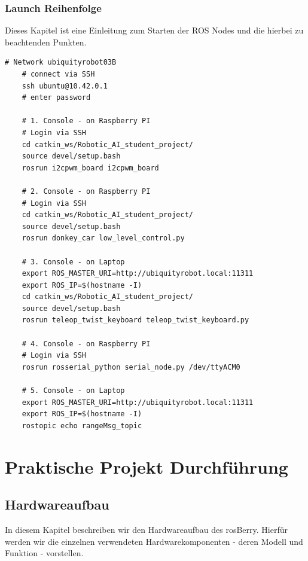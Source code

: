\documentclass[conference]{IEEEtran}
\begin{document}
	\pagebreak
	\subsubsection{Launch Reihenfolge}%
	
	Dieses Kapitel ist eine Einleitung zum Starten der ROS Nodes und die hierbei zu beachtenden Punkten.
	
	\begin{lstlisting}[label={list:first},caption=Sample rosBash code.]
	# Network ubiquityrobot03B
	# connect via SSH
	ssh ubuntu@10.42.0.1
	# enter password
	
	# 1. Console - on Raspberry PI
	# Login via SSH
	cd catkin_ws/Robotic_AI_student_project/
	source devel/setup.bash
	rosrun i2cpwm_board i2cpwm_board
	
	# 2. Console - on Raspberry PI
	# Login via SSH
	cd catkin_ws/Robotic_AI_student_project/
	source devel/setup.bash
	rosrun donkey_car low_level_control.py
	
	# 3. Console - on Laptop 
	export ROS_MASTER_URI=http://ubiquityrobot.local:11311
	export ROS_IP=$(hostname -I)
	cd catkin_ws/Robotic_AI_student_project/
	source devel/setup.bash
	rosrun teleop_twist_keyboard teleop_twist_keyboard.py
	
	# 4. Console - on Raspberry PI
	# Login via SSH
	rosrun rosserial_python serial_node.py /dev/ttyACM0
	
	# 5. Console - on Laptop
	export ROS_MASTER_URI=http://ubiquityrobot.local:11311
	export ROS_IP=$(hostname -I)
	rostopic echo rangeMsg_topic
	\end{lstlisting}
	
	\section{Praktische Projekt Durchführung}
	
	
	\subsection{Hardwareaufbau}%
	In diesem Kapitel beschreiben wir den Hardwareaufbau des rosBerry. Hierfür werden wir die einzelnen verwendeten Hardwarekomponenten - deren Modell und Funktion - vorstellen.
	
\end{document}
